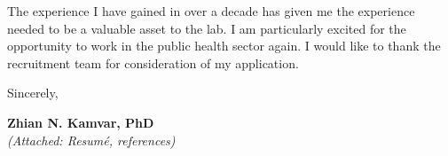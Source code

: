 \vspace{2ex}
The experience I have gained in over a decade has given me the experience needed to be a valuable asset to the lab. 
I am particularly excited for the opportunity to work in the public health sector again.
I would like to thank the recruitment team for consideration of my application.

\vspace{3ex}

Sincerely,

\vspace{4ex}

\textbf{Zhian N. Kamvar, PhD}\\
{\footnotesize \textit{(Attached: Resum\'{e}, references)}}

\clearpage



